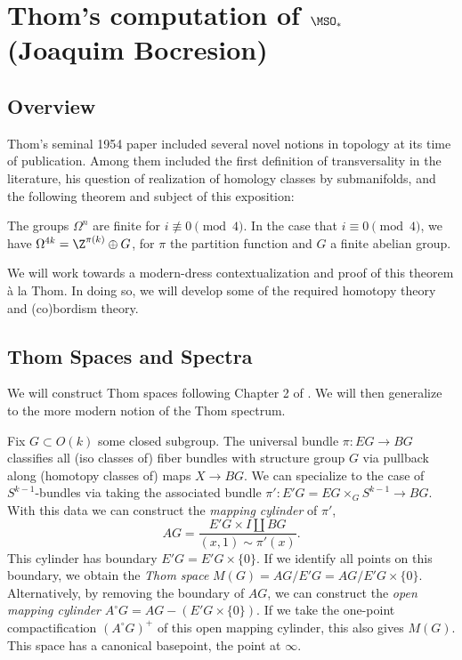 % 

% 


\section{Thom's computation of \texorpdfstring{$\MSO_\ast$}{MSO*}(Joaquim Bocresion)}
\subsection{Overview}
Thom's seminal 1954 paper included several novel notions in topology at its time of publication. Among them included the first definition of transversality in the literature, his question of realization of homology classes by submanifolds, and the following theorem and subject of this exposition:
\begin{theorem}
The groups $\Omega^n$ are finite for $i\not\equiv 0\pmod 4$. In the case that $i\equiv 0\pmod 4$, we have $\Omega^{4k}=\Z^{\pi(k)}\oplus G$, for $\pi$ the partition function and $G$ a finite abelian group.
\end{theorem}
We will work towards a modern-dress contextualization and proof of this theorem \`a la Thom. In doing so, we will develop some of the required homotopy theory and (co)bordism theory. 



\subsection{Thom Spaces and Spectra}
We will construct Thom spaces following Chapter 2 of \cite{thomQuelquesProprietesGlobales1954}. We will then generalize to the more modern notion of the Thom spectrum. 

Fix $G\subset O(k)$ some closed subgroup. The universal bundle $\pi: EG\to BG$ classifies all (iso classes of) fiber bundles with structure group $G$ via pullback along (homotopy classes of) maps $X\to BG$. We can specialize to the case of $S^{k-1}$-bundles via taking the associated bundle $\pi':E'G=EG\times_G S^{k-1}\to BG$. With this data we can construct the \textit{mapping cylinder} of $\pi'$,
\[
AG=\frac{E'G\times I\coprod BG}{(x,1)\sim \pi'(x)}.
\]
This cylinder has boundary $E'G=E'G\times \{0\}$. If we identify all points on this boundary, we obtain the \textit{Thom space} $M(G)=AG/E'G=AG/E'G\times\{0\}$. Alternatively, by removing the boundary of $AG$, we can construct the \textit{open mapping cylinder} $A^\circ G=AG-(E'G\times\{0\})$. If we take the one-point compactification $(A^\circ G)^+$ of this open mapping cylinder, this also gives $M(G)$. This space has a canonical basepoint, the point at $\infty$. 

